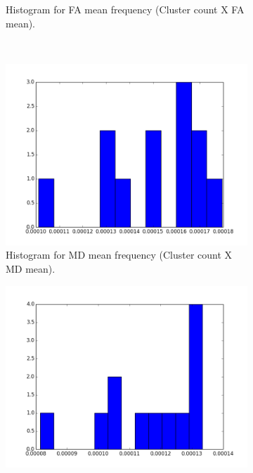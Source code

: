 \documentclass[a4paper,11pt]{report}
\begin{document}
\begin{figure}[!ht]
\begin{subfigure}[t]{.49\textwidth}
        \caption{Histogram for FA mean frequency (Cluster count X FA mean).}
        \label{subfig:fa_hist_fa}
      \end{subfigure}\hfill\\
      \begin{subfigure}[t]{.49\textwidth}
        \includegraphics[width=1\linewidth]{img/histograms/rd_clustered_fa_mask_md_means_hist.png}
        \caption{Histogram for MD mean frequency (Cluster count X MD mean).}
        \label{subfig:fa_hist_md}
      \end{subfigure}\hfill%
      \begin{subfigure}[t]{.49\textwidth}
        \includegraphics[width=1\linewidth]{img/histograms/rd_clustered_fa_mask_rd_means_hist.png}

\end{subfigure}
\end{figure}
\end{document}
